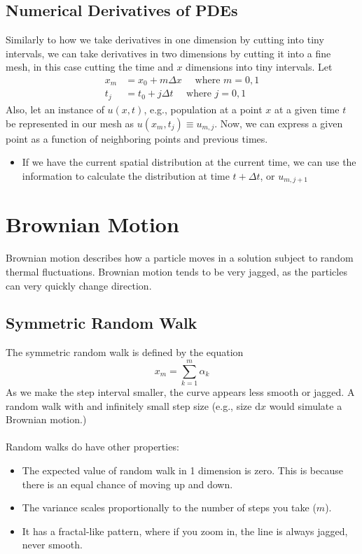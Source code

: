 \documentclass[10pt]{article}
\newcommand{\dd}{\text{d}}
\begin{document}
\subsection*{Numerical Derivatives of PDEs}
Similarly to how we take derivatives in one dimension by cutting into tiny intervals, we can take derivatives in two dimensions by cutting it into a fine mesh, in this case cutting the time and $x$ dimensions into tiny intervals.
Let
\begin{align*}
    x_m &= x_0 + m \Delta x \quad\text{ where } m = 0, 1\\
    t_j &= t_0 + j \Delta t \quad\text{ where } j = 0, 1
\end{align*}
Also, let an instance of $u(x, t)$, e.g., population at a point $x$ at a given time $t$ be represented in our mesh as $u(x_m, t_j) \equiv u_{m, j}$.  Now, we can express a given point as a function of neighboring points and previous times.
\begin{itemize}
    \item If we have the current spatial distribution at the current time, we can use the information to calculate the distribution at time $t + \Delta t$, or $u_{m, j + 1}$
\end{itemize}

\section*{Brownian Motion}
Brownian motion describes how a particle moves in a solution subject to random thermal fluctuations.  Brownian motion tends to be very jagged, as the particles can very quickly change direction.

\subsection*{Symmetric Random Walk}
The symmetric random walk is defined by the equation
\[x_m = \sum_{k = 1}^m \alpha_k\]
As we make the step interval smaller, the curve appears less smooth or jagged.  A random walk with and infinitely small step size (e.g., size $\dd x$ would simulate a Brownian motion.)\\\\
Random walks do have other properties:
\begin{itemize}
    \item The expected value of random walk in 1 dimension is zero.  This is because there is an equal chance of moving up and down.
    \item The variance scales proportionally to the number of steps you take ($m$).
    \item It has a fractal-like pattern, where if you zoom in, the line is always jagged, never smooth.
\end{itemize}
\end{document}
